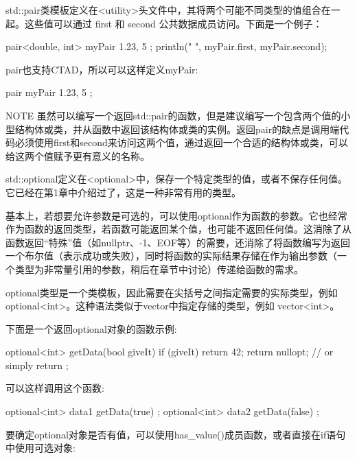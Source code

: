 std::pair类模板定义在<utility>头文件中，其将两个可能不同类型的值组合在一起。这些值可以通过 first 和 second 公共数据成员访问。下面是一个例子：

\begin{cpp}
pair<double, int> myPair { 1.23, 5 };
println("{} {}", myPair.first, myPair.second);
\end{cpp}

pair也支持CTAD，所以可以这样定义myPair:

\begin{cpp}
pair myPair { 1.23, 5 };
\end{cpp}

\begin{myNotic}{NOTE}
虽然可以编写一个返回std::pair的函数，但是建议编写一个包含两个值的小型结构体或类，并从函数中返回该结构体或类的实例。返回pair的缺点是调用端代码必须使用first和second来访问这两个值，通过返回一个合适的结构体或类，可以给这两个值赋予更有意义的名称。
\end{myNotic}


std::optional定义在<optional>中，保存一个特定类型的值，或者不保存任何值。它已经在第1章中介绍过了，这是一种非常有用的类型。

基本上，若想要允许参数是可选的，可以使用optional作为函数的参数。它也经常作为函数的返回类型，若函数可能返回某个值，也可能不返回任何值。这消除了从函数返回“特殊”值（如nullptr、-1、EOF等）的需要，还消除了将函数编写为返回一个布尔值（表示成功或失败），同时将函数的实际结果存储在作为输出参数（一个类型为非常量引用的参数，稍后在章节中讨论）传递给函数的需求。

optional类型是一个类模板，因此需要在尖括号之间指定需要的实际类型，例如 optional<int>。这种语法类似于vector中指定存储的类型，例如 vector<int>。

下面是一个返回optional对象的函数示例:

\begin{cpp}
optional<int> getData(bool giveIt)
{
    if (giveIt) {
        return 42;
    }
    return nullopt; // or simply return {};
}
\end{cpp}

可以这样调用这个函数:

\begin{cpp}
optional<int> data1 { getData(true) };
optional<int> data2 { getData(false) };
\end{cpp}

要确定optional对象是否有值，可以使用has\_value()成员函数，或者直接在if语句中使用可选对象:

